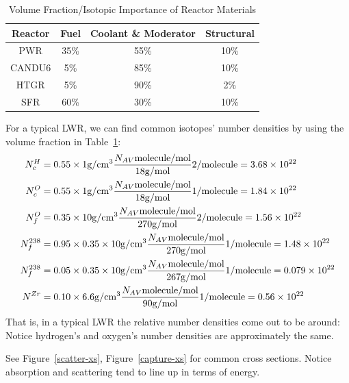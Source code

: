 \documentclass{school-22.211-notes}
\begin{document}
\begin{table}
  \centering
  \begin{tabular}{|c|c|c|c|} \hline
    Reactor & Fuel & Coolant \& Moderator & Structural  \\ \hline \hline
    PWR & 35\% & 55\% & 10\% \\ \hline
    CANDU6 & 5\% & 85\% & 10\%  \\ \hline
    HTGR & 5\% & 90\% & 2\% \\ \hline
    SFR & 60\% & 30\% & 10\% \\ \hline
  \end{tabular}
  \caption{Volume Fraction/Isotopic Importance of Reactor Materials} \label{volume-fraction}
\end{table}
For a typical LWR, we can find common isotopes' number densities by using the volume fraction in Table~\ref{volume-fraction}: 
\begin{align}
N^H_c &= 0.55 \times 1 \mathrm{g}/\mathrm{cm}^3 \frac{N_{AV} \mathrm{molecule}/\mathrm{mol}}{18 \mathrm{g}/\mathrm{mol}} 2/\mathrm{molecule}  = 3.68 \times 10^{22} \\
N^O_c &= 0.55 \times 1 \mathrm{g}/\mathrm{cm}^3 \frac{N_{AV} \mathrm{molecule}/\mathrm{mol}}{18 \mathrm{g}/\mathrm{mol}} 1/\mathrm{molecule}  = 1.84 \times 10^{22} \\
N^O_f &= 0.35 \times 10 \mathrm{g}/\mathrm{cm}^3 \frac{N_{AV} \mathrm{molecule}/\mathrm{mol}}{270 \mathrm{g}/\mathrm{mol}} 2/\mathrm{molecule}  = 1.56 \times 10^{22} \\
N^{238}_f &= 0.95 \times 0.35 \times 10 \mathrm{g}/\mathrm{cm}^3 \frac{N_{AV} \mathrm{molecule}/\mathrm{mol}}{270 \mathrm{g}/\mathrm{mol}} 1/\mathrm{molecule}  = 1.48 \times 10^{22} \\
N^{238}_f &= 0.05 \times 0.35 \times 10 \mathrm{g}/\mathrm{cm}^3 \frac{N_{AV} \mathrm{molecule}/\mathrm{mol}}{267 \mathrm{g}/\mathrm{mol}} 1/\mathrm{molecule}  = 0.079 \times 10^{22} \\
N^{Zr} &= 0.10 \times 6.6 \mathrm{g}/\mathrm{cm}^3 \frac{N_{AV} \mathrm{molecule}/\mathrm{mol}}{90 \mathrm{g}/\mathrm{mol}} 1/\mathrm{molecule}  = 0.56 \times 10^{22} 
\end{align}
That is, in a typical LWR the relative number densities come out to be around: 
Notice hydrogen's and oxygen's number densities are approximately the same. 

See Figure~\ref{scatter-xs}, Figure~\ref{capture-xs} for common cross sections. Notice absorption and scattering tend to line up in terms of energy. 
\end{document}
